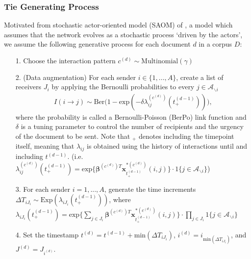 \documentclass[a4paper]{article}
\begin{document}
\subsubsection{Tie Generating Process}\label{subsubsec: Tie Generating Process}
Motivated from stochastic actor-oriented model (SAOM) of \cite{snijders2017stochastic}, a model which assumes that the network evolves as a stochastic process `driven by the actors’, we assume the following generative process for each document $d$ in a corpus $D$:
\begin{itemize}
	\item[1.] Choose the interaction pattern $c^{(d)} \sim \mbox{Multinomial}(\gamma)$
	\item[2.] (Data augmentation) For each sender $i \in \{1,...,A\}$, create a list of receivers $J_i$ by applying the Bernoulli probabilities to every $j \in \mathcal{A}_{\backslash i}$
	\begin{align*} I(i \rightarrow j) \sim \mbox{Ber}\Big(1-\mbox{exp}(-\delta\lambda^{(c^{(d)})}_{ij}(t_+^{(d-1)}))\Big),
	\end{align*}
	where the probability is called a Bernoulli-Poisson (BerPo) link function \citep{zhou2015infinite} and $\delta$ is a tuning parameter to control the number of recipients and the urgency of the document to be sent. Note that $_+$ denotes including the timepoint itself, meaning that $\lambda_{ij}$ is obtained using the history of interactions until and including $t^{(d-1)}$. (i.e. $\lambda^{(c^{(d)})}_{ij}(t_+^{(d-1)})=\mbox{exp}\Big\{\boldsymbol{\beta}^{(c^{(d)})T}\boldsymbol{x}^{*(c^{(d)})}_{t^{(d-1)}_+}(i, j)\Big\}\cdot 1\{j \in \mathcal{A}_{\backslash i}\}$)
	\item[3.] For each sender $i = 1,...,A$, generate the time increments $\Delta T_{i{J_i}} \sim \mbox{Exp}(\lambda_{i{J_i}}(t_+^{(d-1)}))$, where $\lambda_{i{J_i}}(t_+^{(d-1)})= \mbox{exp}\Big\{\sum\limits_{j \in{J_i}}\boldsymbol{\beta}^{(c^{(d)})T}\boldsymbol{x}^{*(c^{(d)})}_{t^{(d-1)}_+}(i, j)\Big\}\cdot \prod\limits_{j \in J_i}1\{j \in \mathcal{A}_{\backslash i}\}$
	 \item[4.] Set the timestamp $t^{(d)} = t^{(d-1)}+\mbox{min}(\Delta T_{i{J_i}})$, $i^{(d)} = i_{\mbox{min}(\Delta T_{i{J_i}})}$, and $J^{(d)} = J_{i^{(d)}}$.
\end{itemize}
\end{document}
